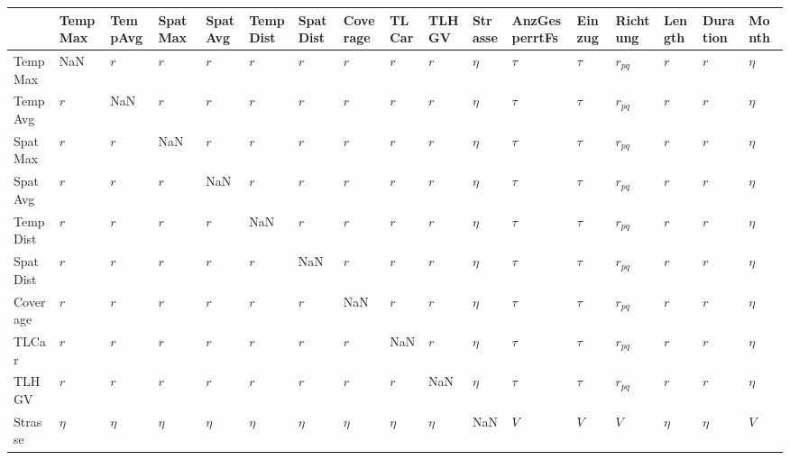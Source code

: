 \begin{tabular}{lllllllllllllllll}
\toprule
{} &   TempMax &   TempAvg &   SpatMax &   SpatAvg &  TempDist &  SpatDist &  Coverage &     TLCar &     TLHGV & Strasse & AnzGesperrtFs &  Einzug &  Richtung &    Length &  Duration &   Month \\
\midrule
TempMax       &       NaN &       $r$ &       $r$ &       $r$ &       $r$ &       $r$ &       $r$ &       $r$ &       $r$ &  $\eta$ &        $\tau$ &  $\tau$ &  $r_{pq}$ &       $r$ &       $r$ &  $\eta$ \\
TempAvg       &       $r$ &       NaN &       $r$ &       $r$ &       $r$ &       $r$ &       $r$ &       $r$ &       $r$ &  $\eta$ &        $\tau$ &  $\tau$ &  $r_{pq}$ &       $r$ &       $r$ &  $\eta$ \\
SpatMax       &       $r$ &       $r$ &       NaN &       $r$ &       $r$ &       $r$ &       $r$ &       $r$ &       $r$ &  $\eta$ &        $\tau$ &  $\tau$ &  $r_{pq}$ &       $r$ &       $r$ &  $\eta$ \\
SpatAvg       &       $r$ &       $r$ &       $r$ &       NaN &       $r$ &       $r$ &       $r$ &       $r$ &       $r$ &  $\eta$ &        $\tau$ &  $\tau$ &  $r_{pq}$ &       $r$ &       $r$ &  $\eta$ \\
TempDist      &       $r$ &       $r$ &       $r$ &       $r$ &       NaN &       $r$ &       $r$ &       $r$ &       $r$ &  $\eta$ &        $\tau$ &  $\tau$ &  $r_{pq}$ &       $r$ &       $r$ &  $\eta$ \\
SpatDist      &       $r$ &       $r$ &       $r$ &       $r$ &       $r$ &       NaN &       $r$ &       $r$ &       $r$ &  $\eta$ &        $\tau$ &  $\tau$ &  $r_{pq}$ &       $r$ &       $r$ &  $\eta$ \\
Coverage      &       $r$ &       $r$ &       $r$ &       $r$ &       $r$ &       $r$ &       NaN &       $r$ &       $r$ &  $\eta$ &        $\tau$ &  $\tau$ &  $r_{pq}$ &       $r$ &       $r$ &  $\eta$ \\
TLCar         &       $r$ &       $r$ &       $r$ &       $r$ &       $r$ &       $r$ &       $r$ &       NaN &       $r$ &  $\eta$ &        $\tau$ &  $\tau$ &  $r_{pq}$ &       $r$ &       $r$ &  $\eta$ \\
TLHGV         &       $r$ &       $r$ &       $r$ &       $r$ &       $r$ &       $r$ &       $r$ &       $r$ &       NaN &  $\eta$ &        $\tau$ &  $\tau$ &  $r_{pq}$ &       $r$ &       $r$ &  $\eta$ \\
Strasse       &    $\eta$ &    $\eta$ &    $\eta$ &    $\eta$ &    $\eta$ &    $\eta$ &    $\eta$ &    $\eta$ &    $\eta$ &     NaN &           $V$ &     $V$ &       $V$ &    $\eta$ &    $\eta$ &     $V$ \\

\end{tabular}
